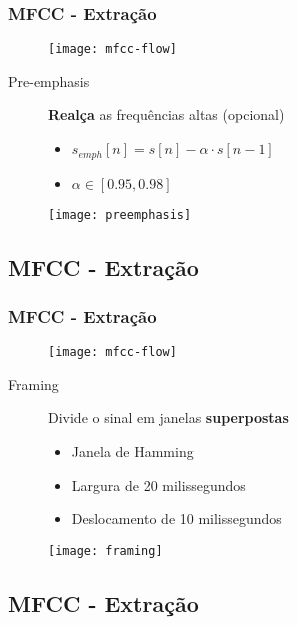 \begin{frame}
\frametitle{MFCC - Extração}
\begin{figure}[ht]
    \centering
    \texttt{[image: mfcc-flow]}
\end{figure}

\begin{description}
    \item[Pre-emphasis] \textbf{Realça} as frequências altas (opcional)
    \pause
    \begin{itemize}
        \item $s_{emph}[n] = s[n] - \alpha \cdot s[n - 1]$
        \item $\alpha \in [0.95, 0.98]$
        \pause
    \end{itemize}
\end{description}
\begin{figure}[ht]
    \centering
    \texttt{[image: preemphasis]}
\end{figure}
\end{frame}

\subsection{MFCC - Extração}

\begin{frame}
\frametitle{MFCC - Extração}
\begin{figure}[ht]
    \centering
    \texttt{[image: mfcc-flow]}
\end{figure}

\begin{description}
    \item[Framing] Divide o sinal em janelas \textbf{superpostas}
    \pause
    \begin{itemize}
        \item Janela de Hamming
        \item Largura de 20 milissegundos
        \item Deslocamento de 10 milissegundos
        \pause
    \end{itemize}
\end{description}
\begin{figure}[ht]
    \centering
    \texttt{[image: framing]}
\end{figure}
\end{frame}

\subsection{MFCC - Extração}

